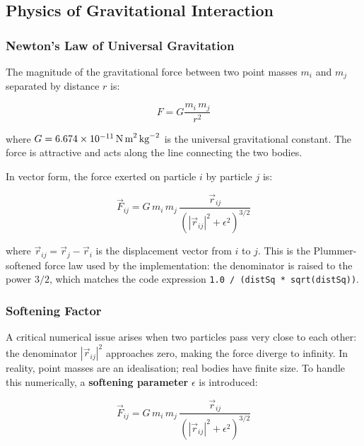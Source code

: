 ﻿\documentclass[12pt,a4paper]{article}
\begin{document}
\subsection{Physics of Gravitational Interaction}

\subsubsection*{Newton's Law of Universal Gravitation}

The magnitude of the gravitational force between two point masses $m_i$ and
$m_j$ separated by distance $r$ is:

\begin{equation}
    F = G \frac{m_i \, m_j}{r^2}
\end{equation}

\noindent where $G = 6.674 \times 10^{-11}\,\text{N\,m}^2\,\text{kg}^{-2}$
is the universal gravitational constant. The force is attractive and acts
along the line connecting the two bodies.

In vector form, the force exerted on particle $i$ by particle $j$ is:

\begin{equation}
    \vec{F}_{ij} = G \, m_i \, m_j \,
    \frac{\vec{r}_{ij}}{\left(\left|\vec{r}_{ij}\right|^2 + \epsilon^2\right)^{3/2}}
\end{equation}

\noindent where $\vec{r}_{ij} = \vec{r}_j - \vec{r}_i$ is the displacement
vector from $i$ to $j$. This is the Plummer-softened force law used by the
implementation: the denominator is raised to the power $3/2$, which matches
the code expression \texttt{1.0 / (distSq * sqrt(distSq))}.

\subsubsection*{Softening Factor}

A critical numerical issue arises when two particles pass very close to each
other: the denominator $|\vec{r}_{ij}|^2$ approaches zero, making the force
diverge to infinity. In reality, point masses are an idealisation; real
bodies have finite size. To handle this numerically, a \textbf{softening
parameter} $\epsilon$ is introduced:

\begin{equation}
    \vec{F}_{ij} = G \, m_i \, m_j \,
    \frac{\vec{r}_{ij}}{\left(\left|\vec{r}_{ij}\right|^2 + \epsilon^2\right)^{3/2}}
\end{equation}
\end{document}
